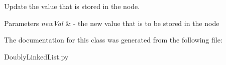 Update the value that is stored in the node. 


\begin{DoxyParams}{Parameters}
{\em new\+Val} & -\/ the new value that is to be stored in the node \\
\hline
\end{DoxyParams}


The documentation for this class was generated from the following file\+:\begin{DoxyCompactItemize}
\item 
Doubly\+Linked\+List.\+py\end{DoxyCompactItemize}
